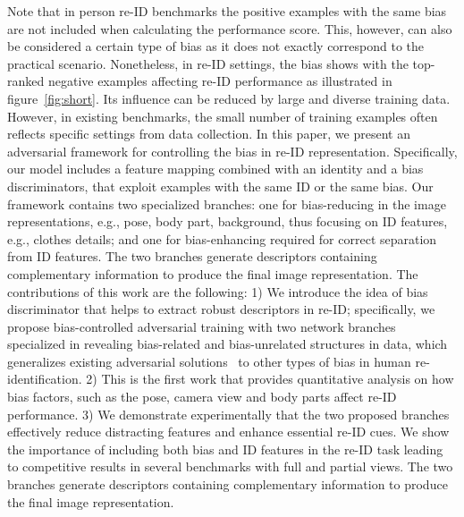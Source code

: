 \documentclass[10pt,twocolumn,letterpaper]{article}
\begin{document}
Note that in person re-ID benchmarks the positive examples with the same bias are not included when calculating the performance score. 
This, however, can also be considered a certain type of bias as it does not exactly correspond to the practical scenario. Nonetheless, in re-ID settings, the bias shows with the top-ranked negative examples affecting re-ID performance as illustrated in figure~\ref{fig:short}.
Its influence can be reduced by large and diverse training data. However, in existing benchmarks, the small number of training examples often reflects specific settings from data collection. 
In this paper, we present an adversarial framework for controlling the bias in re-ID representation. Specifically, our model includes a feature mapping combined with an identity and a bias discriminators, that exploit examples with the same ID or the same bias. Our framework contains two specialized branches: one for {bias-reducing} in the image representations, e.g., pose, body part, background, thus focusing on ID features, e.g., clothes details; and one for {bias-enhancing} required for correct separation from ID features. The two branches generate descriptors containing complementary information to produce the final image representation. The contributions of this work are the following:
1) We introduce the idea of bias discriminator that helps to extract robust descriptors in re-ID;
specifically, we propose bias-controlled adversarial training with two network branches specialized in revealing bias-related and bias-unrelated structures in data, which generalizes existing adversarial solutions~\cite{liu2018exploring,ge2018fd} to other types of bias in human re-identification.  
2) This is the first work that provides quantitative analysis on how bias factors, such as the pose, camera view and body parts affect re-ID performance.  3) We demonstrate experimentally that the two proposed branches {effectively reduce distracting features and enhance essential re-ID cues}. We show the importance of including both bias and ID features in the re-ID task leading to competitive results in several benchmarks with full and partial views. The two branches generate descriptors containing complementary information to produce the final image representation.
\end{document}
